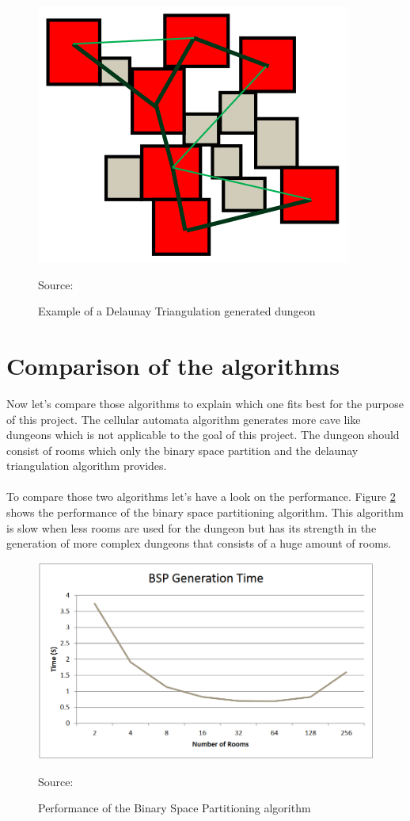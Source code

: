 \documentclass[a4paper,12pt,oneside]{scrreprt}
\begin{document}
\begin{figure}[htb]
\centering
\includegraphics[scale=0.5]{images/delaunay_example.png} 
\caption{Example of a Delaunay Triangulation generated dungeon}
Source: \cite[][]{williams_investigation_nodate}
\label{fig:delaunay_example}
\end{figure}

\section{Comparison of the algorithms}
Now let's compare those algorithms to explain which one fits best for the purpose of this project. The cellular automata algorithm generates more cave like dungeons which is not applicable to the goal of this project. The dungeon should consist of rooms which only the binary space partition and the delaunay triangulation algorithm provides. 
\\
\\
To compare those two algorithms let's have a look on the performance. Figure \ref{fig:bsp_performance} shows the performance of the binary space partitioning algorithm. This algorithm is slow when less rooms are used for the dungeon but has its strength in the generation of more complex dungeons that consists of a huge amount of rooms.  
\begin{figure}[htb]
\centering
\includegraphics[scale=0.5]{images/bsp_performance.png} 
\caption{Performance of the Binary Space Partitioning algorithm}
Source: \cite[][]{williams_investigation_nodate}
\label{fig:bsp_performance}
\end{figure}
\end{document}
